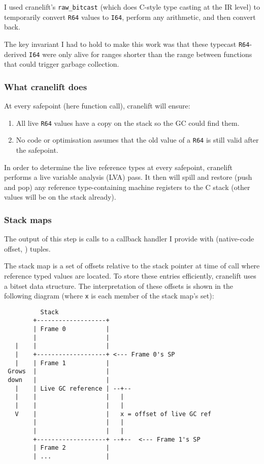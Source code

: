 I used cranelift's \texttt{raw\_bitcast} (which does C-style type casting at the IR level) to
temporarily convert \texttt{R64} values to \texttt{I64}, perform any arithmetic, and then convert
back.

The key invariant I had to hold to make this work was that these typecast \texttt{R64}-derived
\texttt{I64} were only alive for ranges shorter than the range between functions that could
trigger
garbage collection.

\subsubsection{What cranelift does}

At every safepoint (here function call), cranelift will ensure:

\begin{enumerate}
      \item All live \texttt{R64} values have a copy on the stack so the GC could find them.
      \item No code or optimisation assumes that the old value of a \texttt{R64} is still valid
            after the safepoint.
\end{enumerate}

In order to determine the live reference types at every safepoint, cranelift performs a live
variable analysis (LVA) pass. It then will spill and restore (push and pop) any reference
type-containing machine registers to the C stack (other values will be on the stack already).

\subsubsection{Stack maps}

The output of this step is calls to a callback handler I provide with (native-code offset,
) tuples.

The stack map is a set of offsets relative to the stack pointer at time of call where reference
typed values are located. To store these entries efficiently, cranelift uses a bitset data
structure. The interpretation of these offsets is shown in the following diagram (where \texttt{x}
is each member of the stack map's set):

\begin{verbatim}
          Stack
        +-------------------+
        | Frame 0           |
        |                   |
   |    |                   |
   |    +-------------------+ <--- Frame 0's SP
   |    | Frame 1           |
 Grows  |                   |
 down   |                   |
   |    | Live GC reference | --+--
   |    |                   |   |
   |    |                   |   |
   V    |                   |   x = offset of live GC ref
        |                   |   |
        |                   |   |
        +-------------------+ --+--  <--- Frame 1's SP
        | Frame 2           |
        | ...               |
\end{verbatim}

